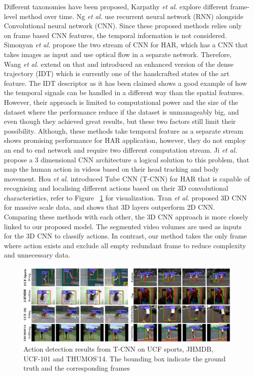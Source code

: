 \documentclass{vldb}
\begin{document}
 Different taxonomies have been proposed, Karpathy \textit{et al.} \cite{karpathy2014large} explore different frame-level method over time. Ng \textit{et al.} \cite{yue2015beyond} use recurrent neural network (RNN) alongside Convolutional neural network (CNN). Since these proposed methods relies only on frame based CNN features, the temporal information is not considered. Simonyan \textit{et al.} \cite{simonyan2014two} propose the two stream of CNN for HAR, which has a CNN that takes images as input and use optical flow in a separate network. Therefore, Wang \textit{et al.} \cite{wang2016actionness} extend on that and introduced an enhanced version of the dense trajectory (IDT) which is currently one of the handcrafted states of the art feature. The IDT descriptor as it has been claimed shows a good example of how the temporal signals can be handled in a different way than the spatial features. However, their approach is limited to computational power and the size of the dataset where the performance reduce if the dataset is unmanageably big, and even though they achieved great results, but these two factors still limit their possibility. Although, these methods take temporal feature as a separate stream shows promising performance for HAR application, however, they do not employ an end to end network and require two different computation stream. Ji \textit{et al.} \cite{ji20133d} propose a 3 dimensional CNN architecture a logical solution to this problem, that map the human action in videos based on their head tracking and body movement. Hou \textit{et al.} \cite{hou2017tube} introduced Tube CNN (T-CNN) for HAR that is capable of recognising and localising different actions based on their 3D convolutional characteristics, refer to Figure ~\ref{fig:T-CNN} for visualization. Tran \textit{et al.} \cite{tran2015learning} proposed 3D CNN for massive scale data, and shows that 3D layers outperform 2D CNN. Comparing these methods with each other, the 3D CNN approach \cite{ji20133d} is more closely linked to our proposed model. The segmented video volumes are used as inputs for the 3D CNN to classify actions. In contrast, our method takes the only frame where action exists and exclude all empty redundant frame to reduce complexity and unnecessary data.
\begin{figure}
\centering
\includegraphics[width=2\columnwidth]{photo/trajectory1.PNG}
\caption{Action detection results from T-CNN on UCF sports, JHMDB, UCF-101 and THUMOS'14. The bounding box indicate the ground truth and the corresponding frames \cite{hou2017tube}}
\label{fig:T-CNN}
\end{figure}
\end{document}
